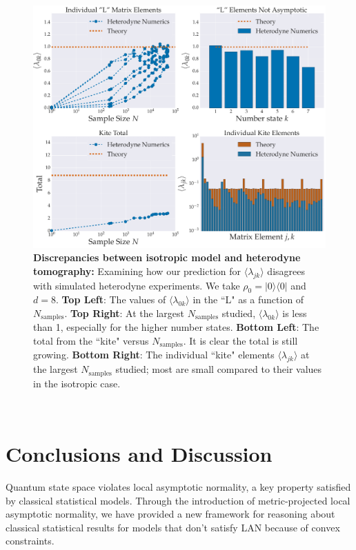 \documentclass[aps,pra, twocolumn]{revtex4-1}
\begin{document}
\begin{figure}
  \includegraphics[width=\columnwidth]{Images/Figure_14.pdf}
 \caption{\textbf{Discrepancies between isotropic model and heterodyne tomography:} Examining how our prediction for $\langle \lambda_{jk} \rangle$ disagrees with simulated heterodyne experiments. We take $\rho_{0} = |0\rangle\langle 0|$ and $d=8$. \textbf{Top Left}: The values of  $\langle \lambda_{0k}\rangle$ in the ``L" as a function of $N_{\mathrm{samples}}$.  \textbf{Top Right}:  At the largest $N_{\mathrm{samples}}$ studied, $\langle \lambda_{0k}\rangle$ is less than 1, especially for the higher number states. \textbf{Bottom Left}: The total from the ``kite" versus $N_{\mathrm{samples}}$. It is clear the total is still growing. \textbf{Bottom Right}: The individual ``kite" elements $\langle \lambda_{jk}\rangle$ at the largest $N_{\mathrm{samples}}$ studied;  most are small compared to their values in the isotropic case.}
\label{fig:individcontrib}
\end{figure}

~\\
\section{Conclusions and Discussion}
Quantum state space violates local asymptotic normality, a key property satisfied by classical statistical models. Through the introduction of metric-projected local asymptotic normality, we have provided a new framework for reasoning about classical statistical results for models that don't satisfy LAN because of convex constraints.
\end{document}
